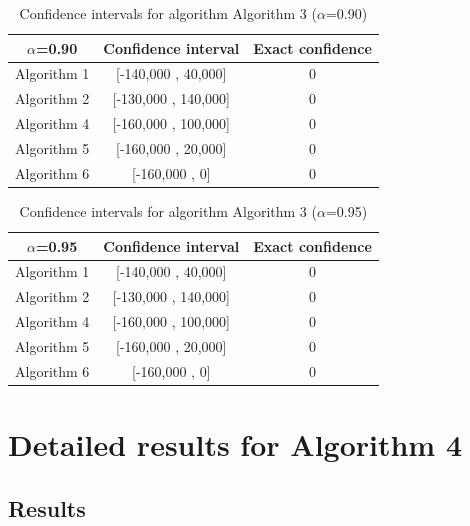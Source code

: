 \documentclass[a4paper,10pt]{article}
\begin{document}
\begin{table}[!htp]
\centering\small
\begin{tabular}{
|c|c|c|}
\hline
 $\alpha$=0.90 & Confidence interval & Exact confidence \\ \hline 
Algorithm 1 & [-140,000 , 40,000] & 0\\ \hline 
Algorithm 2 & [-130,000 , 140,000] & 0\\ \hline 
Algorithm 4 & [-160,000 , 100,000] & 0\\ \hline 
Algorithm 5 & [-160,000 , 20,000] & 0\\ \hline 
Algorithm 6 & [-160,000 , 0] & 0\\ \hline 

\end{tabular}
\caption{Confidence intervals for algorithm Algorithm 3 ($\alpha$=0.90)}
\end{table}
\begin{table}[!htp]
\centering\small
\begin{tabular}{
|c|c|c|}
\hline
 $\alpha$=0.95 & Confidence interval & Exact confidence \\ \hline 
Algorithm 1 & [-140,000 , 40,000] & 0\\ \hline 
Algorithm 2 & [-130,000 , 140,000] & 0\\ \hline 
Algorithm 4 & [-160,000 , 100,000] & 0\\ \hline 
Algorithm 5 & [-160,000 , 20,000] & 0\\ \hline 
Algorithm 6 & [-160,000 , 0] & 0\\ \hline 

\end{tabular}
\caption{Confidence intervals for algorithm Algorithm 3 ($\alpha$=0.95)}
\end{table}

 \clearpage 


\section{Detailed results for Algorithm 4}


\subsection{Results}
\end{document}
